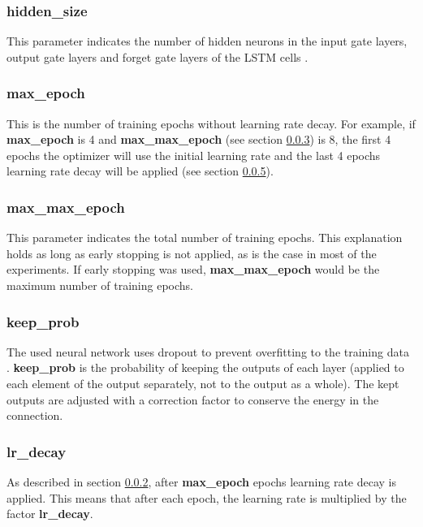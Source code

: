 \documentclass[10pt,a4paper,titlepage]{article}
\begin{document}
\subsubsection{hidden\_size}

This parameter indicates the number of hidden neurons in the input gate layers, output gate layers and forget gate layers of the LSTM cells \cite{LSTM}.

\subsubsection{max\_epoch}
\label{subsubsec:max}

This is the number of training epochs without learning rate decay. For example, if \textbf{max\_epoch} is 4 and \textbf{max\_max\_epoch} (see section \ref{subsubsec:maxmax}) is 8, the first 4 epochs the optimizer will use the initial learning rate and the last 4 epochs learning rate decay will be applied (see section \ref{subsubsec:decay}).

\subsubsection{max\_max\_epoch}
\label{subsubsec:maxmax}

This parameter indicates the total number of training epochs. This explanation holds as long as early stopping is not applied, as is the case in most of the experiments. If early stopping was used, \textbf{max\_max\_epoch} would be the maximum number of training epochs.

\subsubsection{keep\_prob}

The used neural network uses dropout to prevent overfitting to the training data \cite{dropout}. \textbf{keep\_prob} is the probability of keeping the outputs of each layer (applied to each element of the output separately, not to the output as a whole). The kept outputs are adjusted with a correction factor to conserve the energy in the connection.

\subsubsection{lr\_decay}
\label{subsubsec:decay}

As described in section \ref{subsubsec:max}, after \textbf{max\_epoch} epochs learning rate decay is applied. This means that after each epoch, the learning rate is multiplied by the factor \textbf{lr\_decay}.
\end{document}
